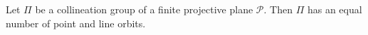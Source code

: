 Let $\Pi$ be a collineation group of a finite projective plane $\mathcal{P}$. Then $\Pi$ has an equal number of point and line orbits.
